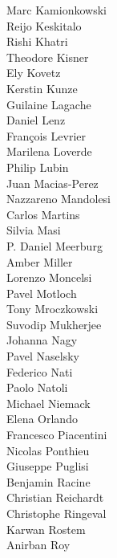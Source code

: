 \documentclass[PICOReport.tex]{subfiles}
\begin{document}
{\begin{multicols}{4}
Marc Kamionkowski               \\
Reijo Keskitalo                 \\
Rishi Khatri                    \\
Theodore Kisner                 \\
Ely Kovetz                      \\
Kerstin Kunze                   \\
Guilaine Lagache                \\
Daniel Lenz                     \\
Fran\c{c}ois Levrier            \\
Marilena Loverde                \\
Philip Lubin                    \\
Juan Macias-Perez               \\
Nazzareno Mandolesi             \\
Carlos Martins                  \\
Silvia Masi                     \\
P. Daniel Meerburg              \\
Amber Miller                    \\
Lorenzo Moncelsi                \\
Pavel Motloch                   \\
Tony Mroczkowski                \\
Suvodip Mukherjee               \\
Johanna Nagy                    \\
Pavel Naselsky                  \\
Federico Nati                   \\
Paolo Natoli                    \\
Michael Niemack                 \\
Elena Orlando                   \\
Francesco Piacentini            \\
Nicolas Ponthieu                \\
Giuseppe Puglisi                \\
Benjamin Racine                 \\
Christian Reichardt             \\
Christophe Ringeval             \\
Karwan Rostem                   \\
Anirban Roy                     \\

\end{multicols}}
\end{document}
